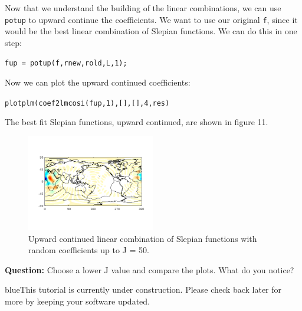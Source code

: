 \documentclass[11pt]{article}
\newcommand{\TAG}{\begin{color}{blue}This tutorial is currently under construction. Please check back later for more by keeping your software updated.\end{color}}
\begin{document}
Now that we understand the building of the linear combinations, we can use \verb|potup| to upward continue the coefficients.  We want to use our original \verb|f|, since it would be the best linear combination of Slepian functions.  We can do this in one step:

\verb|fup = potup(f,rnew,rold,L,1);|

Now we can plot the upward continued coefficients:

\verb|plotplm(coef2lmcosi(fup,1),[],[],4,res)|

The best fit Slepian functions, upward continued, are shown in figure 11.

\begin{figure}[H]
	\centering
	\includegraphics[width=0.5\textwidth]{figures/fup_ml.png}
	\caption{Upward continued linear combination of Slepian functions with random coefficients up to J = 50.}
\end{figure}

\textbf{Question:} Choose a lower J value and compare the plots.  What do you notice?


\TAG
\end{document}
